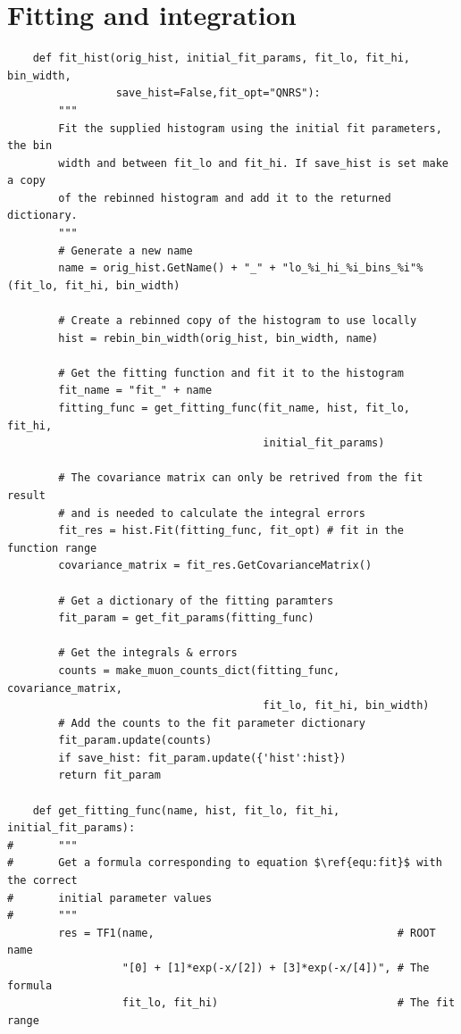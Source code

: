 \documentclass[]{article}
\begin{document}
\section{Fitting and integration} %
\label{app:fitting_and_integration}
\begin{verbatim}
    def fit_hist(orig_hist, initial_fit_params, fit_lo, fit_hi, bin_width, 
                 save_hist=False,fit_opt="QNRS"):
        """
        Fit the supplied histogram using the initial fit parameters, the bin 
        width and between fit_lo and fit_hi. If save_hist is set make a copy 
        of the rebinned histogram and add it to the returned dictionary.
        """
        # Generate a new name
        name = orig_hist.GetName() + "_" + "lo_%i_hi_%i_bins_%i"%(fit_lo, fit_hi, bin_width)

        # Create a rebinned copy of the histogram to use locally
        hist = rebin_bin_width(orig_hist, bin_width, name) 
        
        # Get the fitting function and fit it to the histogram
        fit_name = "fit_" + name
        fitting_func = get_fitting_func(fit_name, hist, fit_lo, fit_hi,
                                        initial_fit_params)
                                        
        # The covariance matrix can only be retrived from the fit result
        # and is needed to calculate the integral errors
        fit_res = hist.Fit(fitting_func, fit_opt) # fit in the function range
        covariance_matrix = fit_res.GetCovarianceMatrix()
        
        # Get a dictionary of the fitting paramters
        fit_param = get_fit_params(fitting_func)

        # Get the integrals & errors
        counts = make_muon_counts_dict(fitting_func, covariance_matrix, 
                                        fit_lo, fit_hi, bin_width)
        # Add the counts to the fit parameter dictionary
        fit_param.update(counts)
        if save_hist: fit_param.update({'hist':hist})
        return fit_param
        
    def get_fitting_func(name, hist, fit_lo, fit_hi, initial_fit_params):
#       """
#       Get a formula corresponding to equation $\ref{equ:fit}$ with the correct
#       initial parameter values
#       """
        res = TF1(name,                                      # ROOT name
                  "[0] + [1]*exp(-x/[2]) + [3]*exp(-x/[4])", # The formula
                  fit_lo, fit_hi)                            # The fit range
                        

\end{verbatim}
\end{document}
